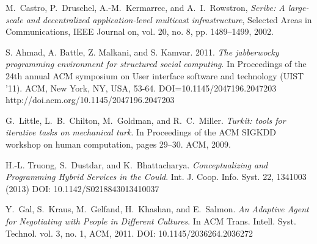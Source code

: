 \documentclass{llncs}
\begin{document}
\begin{thebibliography}{1}
M.~Castro, P.~Druschel, A.-M.~Kermarrec, and A.~I.~Rowstron, \emph{Scribe: A large-scale and decentralized application-level multicast infrastructure}, Selected Areas in Communications, IEEE Journal on, vol. 20, no. 8, pp. 1489–1499, 2002.

S. Ahmad, A. Battle, Z. Malkani, and S. Kamvar. 2011. \emph{The jabberwocky programming environment for structured social computing}. In Proceedings of the 24th annual ACM symposium on User interface software and technology (UIST '11). ACM, New York, NY, USA, 53-64. DOI=10.1145/2047196.2047203 http://doi.acm.org/10.1145/2047196.2047203

G.~Little, L.~B.~Chilton, M.~Goldman, and R.~C.~Miller. \emph{Turkit: tools for iterative tasks on mechanical turk}. In Proceedings of the ACM SIGKDD workshop on human computation, pages 29–30. ACM, 2009.

 H.-L. Truong, S.~Dustdar, and K.~Bhattacharya. \emph{Conceptualizing and Programming Hybrid Services in the Could}. Int. J. Coop. Info. Syst. 22, 1341003 (2013) DOI: 10.1142/S0218843013410037

Y.~Gal, S.~Kraus, M.~Gelfand, H.~Khashan, and E.~Salmon. \emph{An Adaptive Agent for Negotiating with People in Different Cultures}. In  ACM Trans. Intell. Syst. Technol. vol. 3, no. 1, ACM, 2011. DOI: 10.1145/2036264.2036272

\end{thebibliography}
\end{document}
